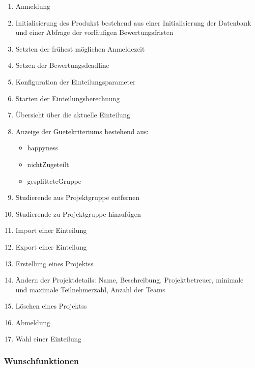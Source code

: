 \documentclass[parskip=full]{scrartcl}
\newcommand{\swtLabel}[1]{\textbf{/#1\arabic*0/}}
\begin{document}
\begin{enumerate}[label=\swtLabel{FA}, resume]
  \item Anmeldung \label{FAadminanmeldung}
  \item Initialisierung des Produkst bestehend aus einer Initialisierung der
  Datenbank und einer Abfrage der vorläufigen Bewertungsfristen %
  \label{FAinit}
  \item Setzten der frühest möglichen Anmeldezeit \label{FAadminanmeldezeit}
  \item Setzen der Bewertungsdeadline \label{FAadmindeadline}
  \item Konfiguration der Einteilungsparameter \label{FAadminparameter}%
  \item Starten der Einteilungsberechnung \label{FAadminEinteilungstart}
  \item Übersicht über die aktuelle Einteilung \label{FAadminÜbersicht}
  \item Anzeige der \glspl{Guetekriterium} bestehend aus:
    \begin{itemize}
      \item \gls{happyness}
      \item \gls{nichtZugeteilt}
      \item \gls{gesplitteteGruppe}
    \end{itemize} \label{FAadminGüte}
  \item Studierende aus Projektgruppe entfernen \label{FAadmin+Stud}
  \item Studierende zu Projektgruppe hinzufügen \label{FAadmin-Stud}
  \item Import einer Einteilung \label{FAimport}
  \item Export einer Einteilung \label{FAexport}
  \item Erstellung eines \glspl{Projekt}s \label{FAadmin+projekt}
  \item Ändern der Projektdetails: Name, Beschreibung, Projektbetreuer, %
        minimale und maximale Teilnehmerzahl, Anzahl der Teams
        \label{FAadminProjektänderung}
  \item Löschen eines \glspl{Projekt}s \label{FAadmin-Projekt}
  \item Abmeldung \label{FAadminAbmeldung}
  \item Wahl einer Einteilung \label{FAadminAuswahl}
\end{enumerate}

\subsubsection{Wunschfunktionen}
\end{document}
